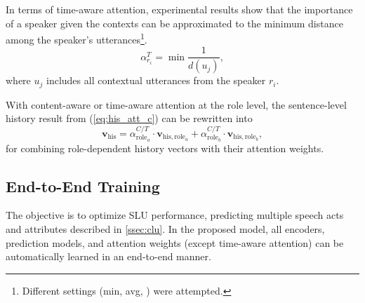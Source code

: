 \documentclass{article}
\begin{document}
In terms of time-aware attention, experimental results show that the importance of a speaker given the contexts can be approximated to the minimum distance among the speaker's utterances\footnote{Different settings (min, avg, ) were attempted.}.
\begin{equation}
\alpha^T_{r_i} = \min \frac{1}{d(u_j)},
\end{equation}
where $u_j$ includes all contextual utterances from the speaker $r_i$.

With content-aware or time-aware attention at the role level,
the sentence-level history result from (\ref{eq:his_att_c}) can be rewritten into
\begin{equation}
\textbf{v}_\text{his} = \alpha^{C/T}_{\text{role}_a} \cdot \textbf{v}_{\text{his}, \text{role}_a}
+ \alpha^{C/T}_{\text{role}_b}\cdot \textbf{v}_{\text{his}, \text{role}_b},
\end{equation}
for combining role-dependent history vectors with their attention weights.

\subsection{End-to-End Training}
The objective is to optimize SLU performance, predicting multiple speech acts and attributes described in \ref{ssec:clu}.
In the proposed model, all encoders, prediction models, and attention weights (except time-aware attention) can be automatically learned in an end-to-end manner.

\end{document}
